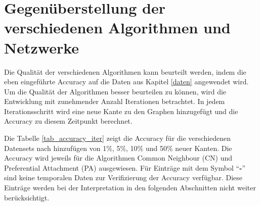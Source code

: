 \section{Gegenüberstellung der verschiedenen Algorithmen und Netzwerke}
\label{comparison}
Die Qualität der verschiedenen Algorithmen kann beurteilt werden, indem die eben eingeführte Accuracy auf die Daten aus Kapitel \ref{daten} angewendet wird.
Um die Qualität der Algorithmen besser beurteilen zu können, wird die Entwicklung mit zunehmender Anzahl Iterationen betrachtet.
In jedem Iterationsschritt wird eine neue Kante zu den Graphen hinzugefügt und die Accuracy zu diesem Zeitpunkt berechnet.

Die Tabelle \ref{tab_accuracy_iter} zeigt die Accuracy für die verschiedenen Datensets nach hinzufügen von 1\%, 5\%, 10\% und 50\% neuer Kanten.
Die Accuracy wird jeweils für die Algorithmen Common Neighbour (CN) und Preferential Attachment (PA) ausgewiesen.
Für Einträge mit dem Symbol ``\textbf{-}'' sind keine temporalen Daten zur Verifizierung der Accuracy verfügbar.
Diese Einträge werden bei der Interpretation in den folgenden Abschnitten nicht weiter berücksichtigt.
